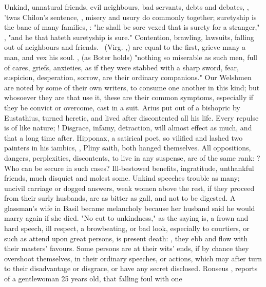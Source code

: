 Unkind, unnatural friends, evil neighbours, bad servants, debts and debates,
\etc{}, 'twas Chilon's sentence, ,
misery and usury do commonly together; suretyship is the bane of many families,
: "he shall be sore vexed that is surety for a
stranger," , "and he that hateth suretyship is
sure." Contention, brawling, lawsuits, falling out of neighbours and friends.--
 (Virg. ,) are equal to the
first, grieve many a man, and vex his soul. , (as Boter holds) "nothing so miserable as such
men, full of cares, griefs, anxieties, as if they were stabbed with a sharp
sword, fear, suspicion, desperation, sorrow, are their ordinary companions."
Our Welshmen are noted by some of their own writers, to
consume one another in this kind; but whosoever they are that use it, these are
their common symptoms, especially if they be convict or overcome,
cast in a suit. Arius put out of a bishopric by
Eustathius, turned heretic, and lived after discontented all his life.
Every repulse is of like nature; ! Disgrace, infamy, detraction, will almost effect as much, and that a
long time after. Hipponax, a satirical poet, so vilified and lashed two
painters in his iambics, ,
Pliny saith, both hanged themselves. All oppositions,
dangers, perplexities, discontents, to live in any
suspense, are of the same rank: ? Who can
be secure in such cases? Ill-bestowed benefits, ingratitude, unthankful
friends, much disquiet and molest some. Unkind speeches trouble as many;
uncivil carriage or dogged answers, weak women above the rest, if they proceed
from their surly husbands, are as bitter as gall, and not to be digested. A
glassman's wife in Basil became melancholy because her husband said he would
marry again if she died. "No cut to unkindness," as the saying is, a frown and
hard speech, ill respect, a browbeating, or bad look, especially to courtiers,
or such as attend upon great persons, is present death: , they ebb and flow with their masters' favours. Some
persons are at their wits' ends, if by chance they overshoot themselves, in
their ordinary speeches, or actions, which may after turn to their disadvantage
or disgrace, or have any secret disclosed. Ronseus , reports of a gentlewoman 25 years old, that falling foul with one
